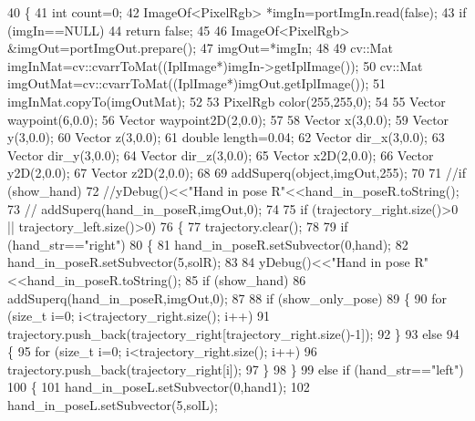 \begin{DoxyCode}
40 \{
41     \textcolor{keywordtype}{int} count=0;
42     ImageOf<PixelRgb> *imgIn=portImgIn.read(\textcolor{keyword}{false});
43     \textcolor{keywordflow}{if} (imgIn==NULL)
44         \textcolor{keywordflow}{return} \textcolor{keyword}{false};
45 
46     ImageOf<PixelRgb> &imgOut=portImgOut.prepare();
47     imgOut=*imgIn;
48 
49     cv::Mat imgInMat=cv::cvarrToMat((IplImage*)imgIn->getIplImage());
50     cv::Mat imgOutMat=cv::cvarrToMat((IplImage*)imgOut.getIplImage());
51     imgInMat.copyTo(imgOutMat);
52 
53     PixelRgb color(255,255,0);
54 
55     Vector waypoint(6,0.0);
56     Vector waypoint2D(2,0.0);
57 
58     Vector x(3,0.0);
59     Vector y(3,0.0);
60     Vector z(3,0.0);
61     \textcolor{keywordtype}{double} length=0.04;
62     Vector dir\_x(3,0.0);
63     Vector dir\_y(3,0.0);
64     Vector dir\_z(3,0.0);
65     Vector x2D(2,0.0);
66     Vector y2D(2,0.0);
67     Vector z2D(2,0.0);  
68 
69     addSuperq(\textcolor{keywordtype}{object},imgOut,255);
70 
71      \textcolor{comment}{//if (show\_hand)}
72     \textcolor{comment}{//yDebug()<<"Hand in pose R"<<hand\_in\_poseR.toString();}
73     \textcolor{comment}{//        addSuperq(hand\_in\_poseR,imgOut,0);}
74 
75     \textcolor{keywordflow}{if} (trajectory\_right.size()>0 || trajectory\_left.size()>0)
76     \{
77         trajectory.clear();
78 
79         \textcolor{keywordflow}{if} (hand\_str==\textcolor{stringliteral}{"right"})
80         \{
81             hand\_in\_poseR.setSubvector(0,hand);
82             hand\_in\_poseR.setSubvector(5,solR);
83 
84             yDebug()<<\textcolor{stringliteral}{"Hand in pose R"}<<hand\_in\_poseR.toString();
85             \textcolor{keywordflow}{if} (show_hand)
86                 addSuperq(hand\_in\_poseR,imgOut,0);
87 
88             \textcolor{keywordflow}{if} (show_only_pose)
89             \{
90                 \textcolor{keywordflow}{for} (\textcolor{keywordtype}{size\_t} i=0; i<trajectory\_right.size(); i++)
91                     trajectory.push\_back(trajectory\_right[trajectory\_right.size()-1]);
92             \}
93             \textcolor{keywordflow}{else}
94             \{
95                 \textcolor{keywordflow}{for} (\textcolor{keywordtype}{size\_t} i=0; i<trajectory\_right.size(); i++)
96                     trajectory.push\_back(trajectory\_right[i]);
97             \}
98         \}
99         \textcolor{keywordflow}{else} \textcolor{keywordflow}{if} (hand\_str==\textcolor{stringliteral}{"left"})
100         \{
101             hand\_in\_poseL.setSubvector(0,hand1);
102             hand\_in\_poseL.setSubvector(5,solL);

\end{DoxyCode}
